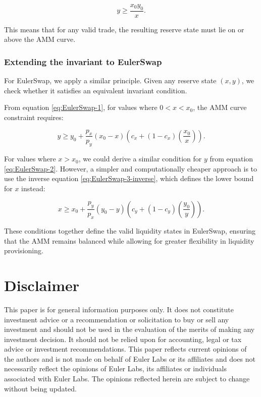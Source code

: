 \documentclass{article}
\begin{document}
\begin{equation}
    y \geq \frac{x_0 y_0}{x}.
\end{equation}

This means that for any valid trade, the resulting reserve state must lie on or above the AMM curve.  

\subsubsection{Extending the invariant to EulerSwap}

For EulerSwap, we apply a similar principle. Given any reserve state $(x, y)$, we check whether it satisfies an equivalent invariant condition.

From equation \eqref{eq:EulerSwap-1}, for values where \( 0 < x < x_0 \), the AMM curve constraint requires:

\begin{equation}
    \label{eq:invariant-x1}
    y \geq y_{0}+\frac{p_{x}}{p_{y}}\left(x_{0}-x\right)\left(c_{x}+\left(1-c_{x}\right)\left(\frac{x_{0}}{x}\right)\right).
\end{equation}

For values where \( x > x_0 \), we could derive a similar condition for $y$ from equation \eqref{eq:EulerSwap-2}. However, a simpler and computationally cheaper approach is to use the inverse equation \eqref{eq:EulerSwap-3-inverse}, which defines the lower bound for $x$ instead:

\begin{equation}
    \label{eq:invariant-x2}
    x \geq x_{0}+\frac{p_{y}}{p_{x}}\left(y_{0}-y\right)\left(c_{y}+\left(1-c_{y}\right)\left(\frac{y_{0}}{y}\right)\right).
\end{equation}

These conditions together define the valid liquidity states in EulerSwap, ensuring that the AMM remains balanced while allowing for greater flexibility in liquidity provisioning.

\section{Disclaimer}

This paper is for general information purposes only. It does not constitute investment
advice or a recommendation or solicitation to buy or sell any investment and should not
be used in the evaluation of the merits of making any investment decision. It should not
be relied upon for accounting, legal or tax advice or investment recommendations. This
paper reflects current opinions of the authors and is not made on behalf of Euler Labs or its
affiliates and does not necessarily reflect the opinions of Euler Labs, its affiliates or individuals
associated with Euler Labs. The opinions reflected herein are subject to change without being
updated.
\end{document}
